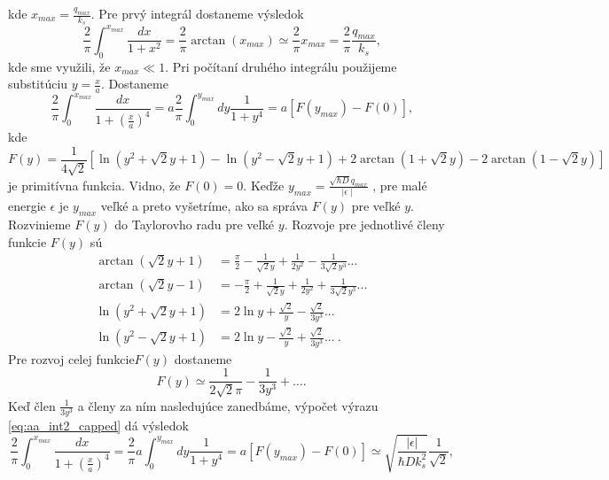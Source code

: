 kde $x_{max}=\frac{q_{max}}{k_s}$. Pre prvý integrál dostaneme výsledok
\begin{equation}
 \label{eq:aa_int1}
 \frac{2}{\pi}\int_0^{x_{max}}\frac{dx}{1+x^2}= \frac{2}{\pi}\arctan{(x_{max})} \simeq  \frac{2}{\pi}x_{max}  = \frac{2}{\pi}\frac{q_{max}}{k_s} \text{,}
\end{equation}
kde sme využili, že $x_{max} \ll 1$. Pri počítaní druhého integrálu použijeme  substitúciu $y=\frac{x}{a}$. Dostaneme
\begin{equation}
 \label{eq:aa_int2_capped}
 \frac{2}{\pi}\int_0^{x_{max}}\frac{dx}{1+(\frac{x}{a})^4} = a\frac{2}{\pi}\int_0^{y_{max}} dy \frac{1}{1+y^4}=a\left[F(y_{max})-F(0)\right]\text{,}
\end{equation}
kde
\begin{equation}
 \label{eq:aa_primitive_func}
 F(y)=\frac{1}{4\sqrt 2}[ \ln(y^2+\sqrt 2 y+1)-\ln(y^2-\sqrt 2 y+1) + 2\arctan(1+\sqrt 2 y ) - 2\arctan(1-\sqrt 2 y)]\text{}
\end{equation}
je primitívna funkcia.
Vidno, že $F(0)=0$.
Keďže $y_{max}=  \frac{\sqrt{\hbar D} q_{max}}{\mid \epsilon \mid}$ , pre malé energie $\epsilon $ je $y_{max}$ veľké a preto vyšetríme, ako sa správa $F(y)$
pre veľké $y$. Rozvinieme $F(y)$ do Taylorovho radu pre veľké $y$. Rozvoje pre jednotlivé členy funkcie $F(y)$ sú
\begin{align*}
 \arctan(\sqrt 2 y+1)&=\frac{\pi}{2}-\frac{1}{\sqrt 2 y}+\frac{1}{2 y^2}-\frac{1}{3 \sqrt 2 y^3} ... \\
 \arctan(\sqrt 2 y -1)&= -\frac{\pi}{2}+\frac{1}{\sqrt 2 y}+\frac{1}{2 y^2}+\frac{1}{3 \sqrt 2 y^3} ...\\
 \ln(y^2+\sqrt 2 y+1)&=  2 \ln y + \frac{\sqrt 2} {y}-\frac{\sqrt 2}{3y^3} ...\\
 \ln(y^2-\sqrt 2 y+1)&= 2 \ln y - \frac{\sqrt 2} {y}+\frac{\sqrt 2}{3y^3}...\ \text{.}
\end{align*}
Pre rozvoj celej funkcie$F(y)$ dostaneme
\begin{equation}
 \label{eq:aa_primitive_func_taylor}
F(y)\simeq \frac{1}{2\sqrt2\pi} - \frac{1}{3y^3} + \dots \text{.}
\end{equation}
Keď  člen $\frac{1}{3y^3}$ a členy za ním nasledujúce zanedbáme,
výpočet výrazu \eqref{eq:aa_int2_capped}  dá výsledok
\begin{equation}
 \label{eq:aa_int2_capped_final}
 \frac{2}{\pi}\int_0^{x_{max}}\frac{dx}{1+(\frac{x}{a})^4} = \frac{2}{\pi}a\int_0^{y_{max}} dy \frac{1}{1+y^4}=a\left[F(y_{max})-F(0)\right]
  \simeq
  \sqrt{\frac{|\epsilon|}{\hbar D k_s^2}} \frac{1}{\sqrt{2}}\text{,}
\end{equation}
